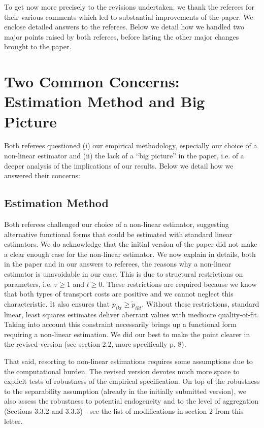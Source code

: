 \documentclass[12pt]{article}
\begin{document}
To get now more precisely to the revisions undertaken, we thank the referees for their various comments which led to substantial improvements of the paper. We enclose detailed answers to the referees. Below we detail how we handled two major points raised by both referees, before listing the other major changes brought to the paper.

\section{Two Common Concerns: Estimation Method and Big Picture}
Both referees questioned (i) our empirical methodology, especially our choice of a non-linear estimator and (ii) the lack of a ``big picture'' in the paper, i.e. of a deeper analysis of the implications of our results. Below we detail how we answered their concerns:\medskip

\subsection{Estimation Method}
Both referees challenged our choice of a non-linear estimator, suggesting alternative functional forms that could be estimated with standard linear estimators. We do acknowledge that the initial version of the paper did not make a clear enough case for the non-linear estimator. We now explain in details, both in the paper and in our answers to referees, the reasons why a non-linear estimator is unavoidable in our case. This is due to structural restrictions on parameters, i.e. $\tau \geq 1$ and $t\geq 0$. These restrictions are required because we know that both types of transport costs are positive and we cannot neglect this characteristic. It also ensures that $p_{ikt} \geq  \widetilde{p}_{ikt}$. Without these restrictions, standard linear, least squares estimates deliver aberrant values with mediocre quality-of-fit. Taking into account this constraint necessarily brings up a functional form requiring a non-linear estimation. We did our best to make the point clearer in the revised version (see section 2.2, more specifically p. 8). \medskip

That said, resorting to non-linear estimations requires some assumptions due to the computational burden. The revised version devotes much more space to explicit tests of robustness of the empirical specification. On top of the robustness to the separability assumption (already in the initially submitted version), we also assess the robustness to potential endogeneity and to the level of aggregation (Sections 3.3.2 and 3.3.3) - see the list of modifications in section 2 from this letter. \medskip
\end{document}
